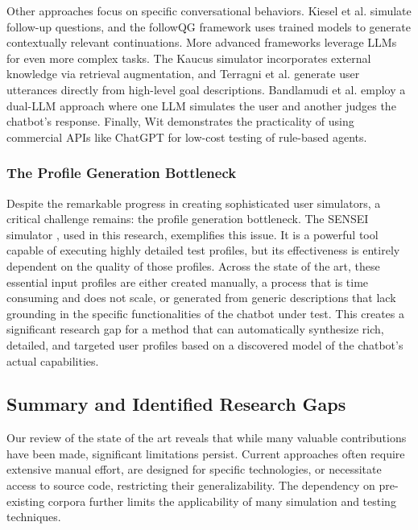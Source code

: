 Other approaches focus on specific conversational behaviors.
Kiesel et al. \autocite{kieselSimulatingFollowUpQuestions2024}
simulate follow-up questions,
and the followQG framework \autocite{bImprovingAsynchronousInterview2021}
uses trained models to generate contextually relevant continuations.
More advanced frameworks leverage \acp{LLM} for even more complex tasks.
The Kaucus simulator \autocite{dholeKAUCUSKnowledgeAugmented2024}
incorporates external knowledge via retrieval augmentation,
and Terragni et al. \autocite{terragniInContextLearningUser2023}
generate user utterances directly from high-level goal descriptions.
Bandlamudi et al. \autocite{bandlamudiFrameworkEnableTest2024}
employ a dual-\ac{LLM} approach where
one \ac{LLM} simulates the user and
another judges the chatbot's response.
Finally, Wit \autocite{dewitLeveragingLargeLanguage2024}
demonstrates the practicality of using commercial APIs like ChatGPT
for low-cost testing of rule-based agents.

\subsubsection{The Profile Generation Bottleneck}
Despite the remarkable progress in creating sophisticated user simulators,
a critical challenge remains: the profile generation bottleneck.
The SENSEI simulator \autocite{delaraSensei},
used in this research, exemplifies this issue.
It is a powerful tool capable of executing highly detailed test profiles,
but its effectiveness is entirely dependent on the quality of those profiles.
Across the state of the art,
these essential input profiles are either created manually,
a process that is time consuming and does not scale,
or generated from generic descriptions
that lack grounding in the specific functionalities of the chatbot under test.
This creates a significant research gap
for a method that can automatically synthesize
rich, detailed, and targeted user profiles
based on a discovered model of the chatbot's actual capabilities.

\subsection{Summary and Identified Research Gaps}
Our review of the state of the art
reveals that while many valuable contributions have been made,
significant limitations persist.
Current approaches often require extensive manual effort,
are designed for specific technologies,
or necessitate access to source code,
restricting their generalizability.
The dependency on pre-existing corpora
further limits the applicability
of many simulation and testing techniques.

